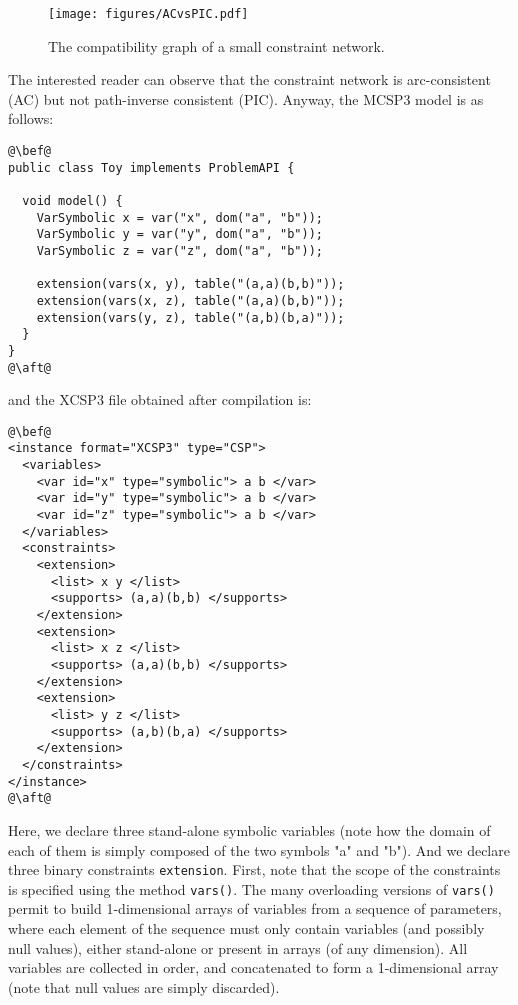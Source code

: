 \documentclass[10pt]{article}
\def\xt{{\rm XCSP3}\xspace}
\newcommand{\gb}[1]{{\tt #1}} %
\newcommand{\nn}[1]{{\tt #1}} %
\def\mt{{\rm MCSP3}\xspace}
\def\xt{{\rm XCSP3}\xspace}
\begin{document}
\begin{figure}
\begin{center}
  \texttt{[image: figures/ACvsPIC.pdf]}
\end{center}
\caption{The compatibility graph of a small constraint network.\label{fig:small}}
\end{figure}

The interested reader can observe that the constraint network is arc-consistent (AC) but not path-inverse consistent (PIC).
Anyway, the \mt model is as follows:


\begin{lstlisting}
@\bef@
public class Toy implements ProblemAPI {
  
  void model() {
    VarSymbolic x = var("x", dom("a", "b"));
    VarSymbolic y = var("y", dom("a", "b"));
    VarSymbolic z = var("z", dom("a", "b"));
    
    extension(vars(x, y), table("(a,a)(b,b)"));
    extension(vars(x, z), table("(a,a)(b,b)"));
    extension(vars(y, z), table("(a,b)(b,a)"));
  }
}
@\aft@
\end{lstlisting}

and the \xt file obtained after compilation is:

\begin{lstlisting}
@\bef@
<instance format="XCSP3" type="CSP">
  <variables>
    <var id="x" type="symbolic"> a b </var>
    <var id="y" type="symbolic"> a b </var>
    <var id="z" type="symbolic"> a b </var>
  </variables>
  <constraints>
    <extension>
      <list> x y </list>
      <supports> (a,a)(b,b) </supports>
    </extension>
    <extension>
      <list> x z </list>
      <supports> (a,a)(b,b) </supports>
    </extension>
    <extension>
      <list> y z </list>
      <supports> (a,b)(b,a) </supports>
    </extension>
  </constraints>
</instance>
@\aft@
\end{lstlisting}



Here, we declare three stand-alone symbolic variables (note how the domain of each of them is simply composed of the two symbols "a" and "b").
And we declare three binary constraints \gb{extension}. First, note that the scope of the constraints is specified using the method \nn{vars()}.
The many overloading versions of \nn{vars()} permit to build 1-dimensional arrays of variables from a sequence of parameters, where each element of the sequence must only contain variables (and possibly null values), either stand-alone or present in arrays (of any dimension).
All variables are collected in order, and concatenated to form a 1-dimensional array (note that null values are simply discarded).
\end{document}
